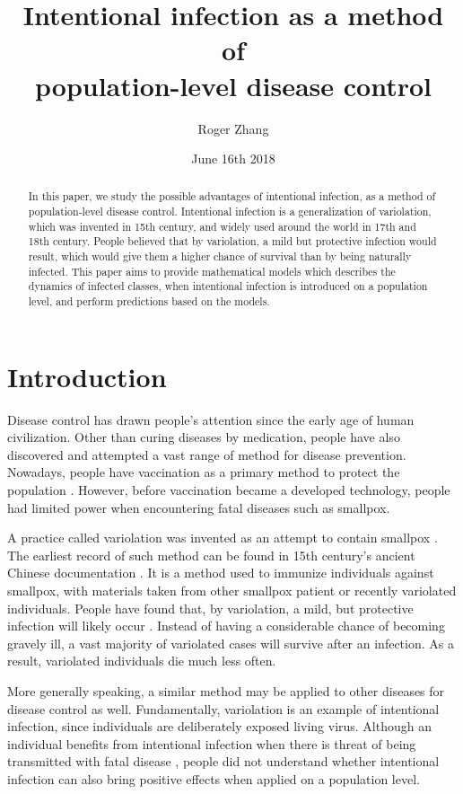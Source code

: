 \documentclass[12pt]{article}
\title{Intentional infection as a method of\\population-level disease control}
\author{Roger Zhang}
\date{June 16th 2018}
\begin{document}
\linenumbers
\maketitle
\begin{abstract}
In this paper, we study the possible advantages of intentional infection, as a method of population-level disease control. Intentional infection is a generalization of variolation, which was invented in 15th century, and widely used around the world in 17th and 18th century. People believed that by variolation, a mild but protective infection would result, which would give them a higher chance of survival than by being naturally infected. This paper aims to provide mathematical models which describes the dynamics of infected classes, when intentional infection is introduced on a population level, and perform predictions based on the models.
\end{abstract}
\clearpage
\tableofcontents
\clearpage
\section{Introduction}

Disease control has drawn people's attention since the early age of human civilization. Other than curing diseases by medication, people have also discovered and attempted a vast range of method for disease prevention. Nowadays, people have vaccination as a primary method to protect the population \cite{bloom2006priorities}. However, before vaccination became a developed technology, people had limited power when encountering fatal diseases such as smallpox.

A practice called variolation was invented as an attempt to contain smallpox \cite{henderson1976eradication}. The earliest record of such method can be found in 15th century's ancient Chinese documentation \cite{leung2011variolation}. It is a method used to immunize individuals against smallpox, with materials taken from other smallpox patient or recently variolated individuals. People have found that, by variolation, a mild, but protective infection will likely occur \cite{leung2011variolation}. Instead of having a considerable chance of becoming gravely ill, a vast majority of variolated cases will survive after an infection. As a result, variolated individuals die much less often.

More generally speaking, a similar method may be applied to other diseases for disease control as well. Fundamentally, variolation is an example of intentional infection, since individuals are deliberately exposed living virus. Although an individual benefits from intentional infection when there is threat of being transmitted with fatal disease \cite{leung2011variolation}, people did not understand whether intentional infection can also bring positive effects when applied on a population level. 
\end{document}
